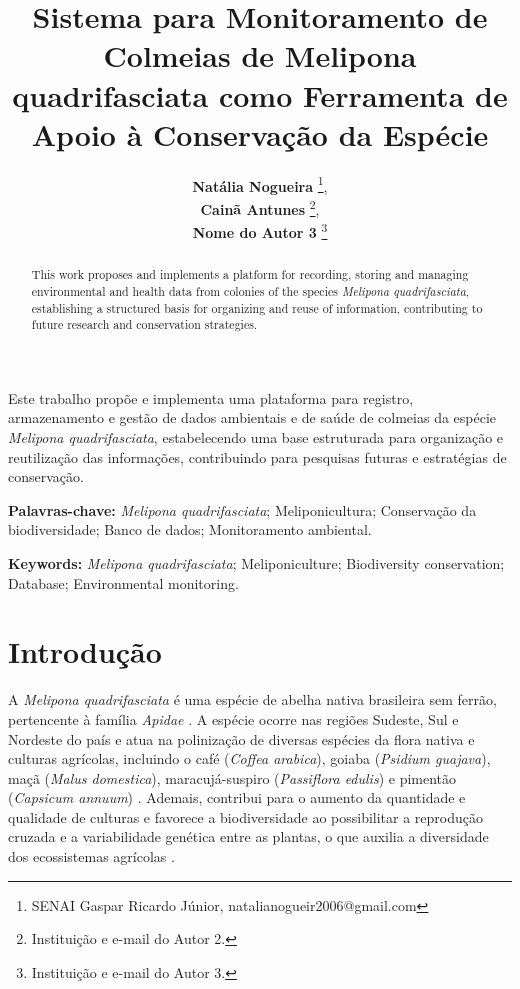 \documentclass[12pt]{unisenaiclass}
\title{Sistema para Monitoramento de Colmeias de Melipona quadrifasciata como Ferramenta de Apoio à Conservação da Espécie}
\subtitle{}
\author{
    \textbf{Natália Nogueira} \thanks{SENAI Gaspar Ricardo Júnior, natalianogueir2006@gmail.com},\\
    \textbf{Cainã Antunes} \thanks{Instituição e e-mail do Autor 2.},\\
    \textbf{Nome do Autor 3} \thanks{Instituição e e-mail do Autor 3.}
}
\begin{document}
\maketitle

\begin{resumo}
Este trabalho propõe e implementa uma plataforma para registro, armazenamento e gestão de dados ambientais e de saúde de colmeias da espécie \textit{Melipona quadrifasciata}, estabelecendo uma base estruturada para organização e reutilização das informações, contribuindo para pesquisas futuras e estratégias de conservação.
\end{resumo}

\begin{justify}
    \textbf{Palavras-chave:} \textit{Melipona quadrifasciata}; Meliponicultura; Conservação da biodiversidade; Banco de dados; Monitoramento ambiental.
\end{justify}

\begin{abstract}
This work proposes and implements a platform for recording, storing and managing environmental and health data from colonies of the species \textit{Melipona quadrifasciata}, establishing a structured basis for organizing and reuse of information, contributing to future research and conservation strategies.
\end{abstract}

\begin{justify}
    \textbf{Keywords:} \textit{Melipona quadrifasciata}; Meliponiculture; Biodiversity conservation; Database; Environmental monitoring.    
\end{justify}    

\newpage

\section{Introdução}
A \textit{Melipona quadrifasciata} é uma espécie de abelha nativa brasileira sem ferrão, pertencente à família \textit{Apidae} \cite{silveira2002abelhas}. A espécie ocorre nas regiões Sudeste, Sul e Nordeste do país \cite{carvalhozilse2011meliponicultura} e atua na polinização de diversas espécies da flora nativa e culturas agrícolas, incluindo o café (\textit{Coffea arabica}), goiaba (\textit{Psidium guajava}), maçã (\textit{Malus domestica}), maracujá-suspiro (\textit{Passiflora edulis}) e pimentão (\textit{Capsicum annuum}) \cite{wolowski2019polinizacao}. Ademais, contribui para o aumento da quantidade e qualidade de culturas \cite{silva2022meliponicultura} e favorece a biodiversidade ao possibilitar a reprodução cruzada e a variabilidade genética entre as plantas, o que auxilia a diversidade dos ecossistemas agrícolas \cite{calazans2019visitantes}.
\end{document}
